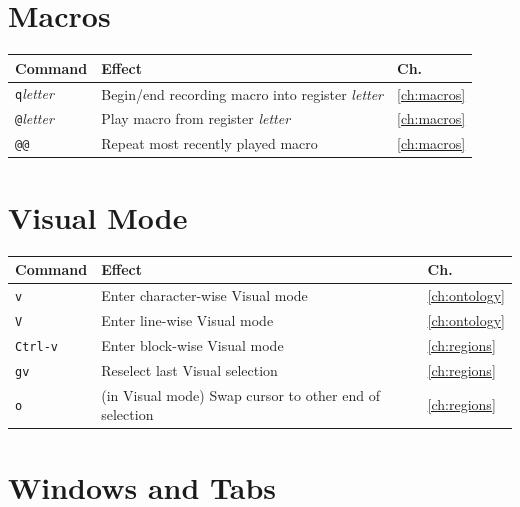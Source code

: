 \section{Macros}

\begin{longtable}{@{}l p{9cm} l@{}}
\textbf{Command} & \textbf{Effect} & \textbf{Ch.} \\
\hline
\endhead
\texttt{q}\textit{letter} & Begin/end recording macro into register \textit{letter} & \ref{ch:macros} \\
\texttt{@}\textit{letter} & Play macro from register \textit{letter} & \ref{ch:macros} \\
\texttt{@@} & Repeat most recently played macro & \ref{ch:macros} \\
\end{longtable}

\section{Visual Mode}

\begin{longtable}{@{}l p{9cm} l@{}}
\textbf{Command} & \textbf{Effect} & \textbf{Ch.} \\
\hline
\endhead
\texttt{v} & Enter character-wise Visual mode & \ref{ch:ontology} \\
\texttt{V} & Enter line-wise Visual mode & \ref{ch:ontology} \\
\texttt{Ctrl-v} & Enter block-wise Visual mode & \ref{ch:regions} \\
\texttt{gv} & Reselect last Visual selection & \ref{ch:regions} \\
\texttt{o} & (in Visual mode) Swap cursor to other end of selection & \ref{ch:regions} \\
\end{longtable}

\section{Windows and Tabs}

